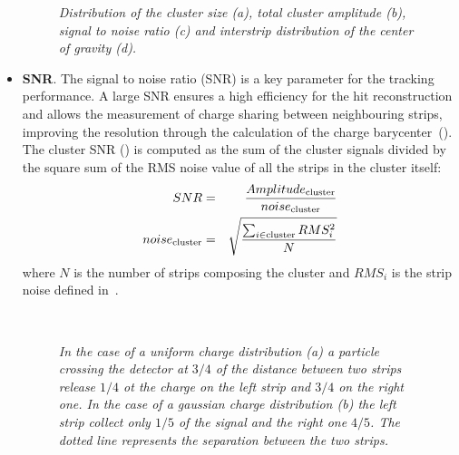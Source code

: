 \begin{itemize}
\begin{figure}[!htbp]
  \caption { {\it Distribution of the cluster size (a), total cluster
      amplitude (b), signal to noise ratio (c) and interstrip distribution of
      the center of gravity (d).} }
\end{figure}

\item {\bf SNR}. The signal to noise ratio (SNR) is a key parameter for the
  tracking performance. A large SNR ensures a high efficiency for the hit
  reconstruction and allows the measurement of charge sharing between
  neighbouring strips, improving the resolution through the calculation of the
  charge barycenter~(). The cluster SNR () is computed as the sum
  of the cluster signals divided by the square sum of the RMS noise value of all
  the strips in the
  cluster itself:
\begin{eqnarray}
SNR &=& \frac{Amplitude_{\rm cluster}}{noise_{\rm cluster}} \label{eq:cluster_snr}\\
noise_{\rm cluster} & = & \sqrt{\frac{\sum_{i\in {\rm cluster}} RMS_i^2}{N}}\label{eq:cluster_noise}
\end{eqnarray}
where $N$ is the number of strips composing the cluster and $RMS_i$ is the strip
noise defined in~.

\begin{figure}
  \centering 
  \\
  \caption{ \it In the case of a uniform charge distribution (a) a particle
    crossing the detector at $3/4$ of the distance between two strips release
    $1/4$ ot the charge on the left strip and $3/4$ on the right one. In the
    case of a gaussian charge distribution (b) the left strip collect only $1/5$
    of the signal and the right one $4/5$. The dotted line represents the
    separation between the two strips.}


\end{figure}
\end{itemize}
